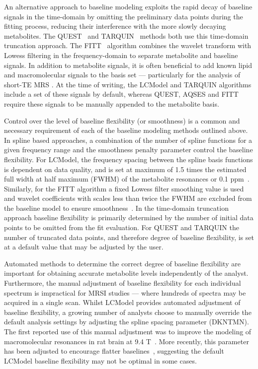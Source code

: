 \documentclass[num-refs]{wiley-article}
\begin{document}
An alternative approach to baseline modeling exploits the rapid decay of baseline signals in the time-domain by omitting the preliminary data points during the fitting process, reducing their interference with the more slowly decaying metabolites. The QUEST~\cite{Ratiney2005} and TARQUIN~\cite{Wilson2011} methods both use this time-domain truncation approach. The FITT~\cite{Young1998} algorithm combines the wavelet transform with Lowess filtering in the frequency-domain to separate metabolite and baseline signals. In addition to metabolite signals, it is often beneficial to add known lipid and macromolecular signals to the basis set --- particularly for the analysis of short-TE MRS \cite{Seeger2003}. At the time of writing, the LCModel and TARQUIN algorithms include a set of these signals by default, whereas QUEST, AQSES and FITT require these signals to be manually appended to the metabolite basis.

Control over the level of baseline flexibility (or smoothness) is a common and necessary requirement of each of the baseline modeling methods outlined above. In spline based approaches, a combination of the number of spline functions for a given frequency range and the smoothness penalty parameter control the baseline flexibility. For LCModel, the frequency spacing between the spline basis functions is dependent on data quality, and is set at maximum of 1.5 times the estimated full width at half maximum (FWHM) of the metabolite resonances or 0.1 ppm~\cite{Provencher1993}. Similarly, for the FITT algorithm a fixed Lowess filter smoothing value is used and wavelet coefficients with scales less than twice the FWHM are excluded from the baseline model to ensure smoothness~\cite{Young1998}. In the time-domain truncation approach baseline flexibility is primarily determined by the number of initial data points to be omitted from the fit evaluation. For QUEST and TARQUIN the number of truncated data points, and therefore degree of baseline flexibility, is set at a default value that may be adjusted by the user.

Automated methods to determine the correct degree of baseline flexibility are important for obtaining accurate metabolite levels independently of the analyst. Furthermore, the manual adjustment of baseline flexibility for each individual spectrum is impractical for MRSI studies --- where hundreds of spectra may be acquired in a single scan. Whilst LCModel provides automated adjustment of baseline flexibility, a growing number of analysts choose to manually override the default analysis settings by adjusting the spline spacing parameter (DKNTMN). The first reported use of this manual adjustment was to improve the modeling of macromolecular resonances in rat brain at 9.4 T~\cite{Pfeuffer1999}. More recently, this parameter has been adjusted to encourage flatter baselines~\cite{Deelchand2016,Terpstra2010,Marjanska2018}, suggesting the default LCModel baseline flexibility may not be optimal in some cases.
\end{document}

